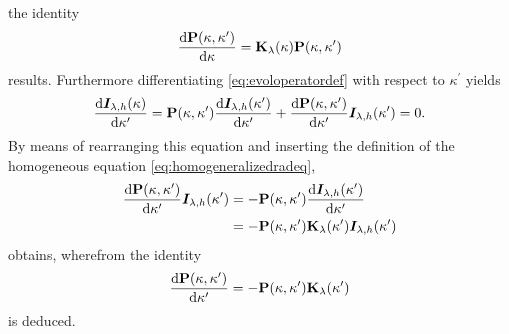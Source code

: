 \documentclass[a4paper,12pt]{report}
\def\lk#1{{\color{black}{#1}}}
\begin{document}
\begin{align}
\begin{aligned}
\end{aligned}
\end{align} the identity \begin{equation}\label{eq:grte_op_id_1}
\frac{\mathrm{d}\boldsymbol{\mathbf{P}}(\kappa,\kappa^\prime)}{\mathrm{d}\kappa} = \boldsymbol{\mathbf{K}}_\lambda(\kappa)\boldsymbol{\mathbf{P}}(\kappa,\kappa^\prime)
\end{equation} results. Furthermore differentiating \cref{eq:evoloperatordef} with respect to $\kappa^\prime$ yields \begin{align}
\begin{aligned}
\frac{\mathrm{d}\bm{I}_{\lambda,h}(\kappa)}{\mathrm{d}\kappa^\prime} = \boldsymbol{\mathbf{P}}(\kappa,\kappa^\prime)\frac{\mathrm{d}\bm{I}_{\lambda,h}(\kappa^\prime)}{\mathrm{d}\kappa^\prime} + \frac{\mathrm{d}\boldsymbol{\mathbf{P}}(\kappa,\kappa^\prime)}{\mathrm{d}\kappa^\prime}\bm{I}_{\lambda,h}(\kappa^\prime) = 0.
\end{aligned}
\end{align} By means of rearranging this equation and inserting the definition of the homogeneous equation \cref{eq:homogeneralizedradeq}, \lk{the expression} \begin{align}
\begin{aligned}
\frac{\mathrm{d}\boldsymbol{\mathbf{P}}(\kappa,\kappa^\prime)}{\mathrm{d}\kappa^\prime}\bm{I}_{\lambda,h}(\kappa^\prime) &= -\boldsymbol{\mathbf{P}}(\kappa,\kappa^\prime)\frac{\mathrm{d}\bm{I}_{\lambda,h}(\kappa^\prime)}{\mathrm{d}\kappa^\prime} \\ &= -\boldsymbol{\mathbf{P}}(\kappa,\kappa^\prime)\boldsymbol{\mathbf{K}}_\lambda(\kappa^\prime)\bm{I}_{\lambda,h}(\kappa^\prime)
\end{aligned}
\end{align} obtains, wherefrom the identity \begin{equation}\label{eq:grte_op_id_2}
\frac{\mathrm{d}\boldsymbol{\mathbf{P}}(\kappa,\kappa^\prime)}{\mathrm{d}\kappa^\prime} = -\boldsymbol{\mathbf{P}}(\kappa,\kappa^\prime)\boldsymbol{\mathbf{K}}_\lambda(\kappa^\prime)
\end{equation} is deduced.
\end{document}
